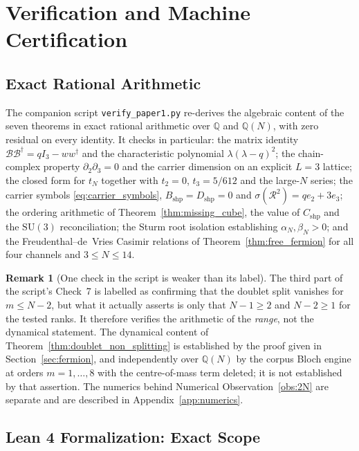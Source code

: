 \documentclass[11pt,a4paper]{article}
\theoremstyle{definition}
\newtheorem{remark}[theorem]{Remark}
\newcommand{\Q}{\mathbb{Q}}
\newcommand{\dg}{^{\dagger}}
\newcommand{\SU}{\mathrm{SU}}
\newcommand{\Bc}{\mathcal{B}}          %
\newcommand{\Rc}{\mathcal{R}}          %
\newcommand{\Bshp}{B_{\mathrm{shp}}}
\newcommand{\Cshp}{C_{\mathrm{shp}}}
\newcommand{\Dshp}{D_{\mathrm{shp}}}
\begin{document}
\section{Verification and Machine Certification}\label{sec:verification}

\subsection{Exact Rational Arithmetic}

The companion script \texttt{verify\_paper1.py} re-derives the algebraic content of the seven theorems in exact rational arithmetic over $\Q$ and $\Q(N)$, with zero residual on every identity. It checks in particular: the matrix identity $\Bc\Bc\dg = qI_3 - ww\dg$ and the characteristic polynomial $\lambda(\lambda-q)^2$; the chain-complex property $\partial_2\partial_3 = 0$ and the carrier dimension on an explicit $L=3$ lattice; the closed form for $t_N$ together with $t_2 = 0$, $t_3 = 5/612$ and the large-$N$ series; the carrier symbols \eqref{eq:carrier_symbols}, $\Bshp = \Dshp = 0$ and $\sigma(\Rc^2) = qe_2 + 3e_3$; the ordering arithmetic of Theorem~\ref{thm:missing_cube}, the value of $\Cshp$ and the $\SU(3)$ reconciliation; the Sturm root isolation establishing $\alpha_N,\beta_N>0$; and the Freudenthal--de~Vries Casimir relations of Theorem~\ref{thm:free_fermion} for all four channels and $3\le N\le 14$.

\begin{remark}[One check in the script is weaker than its label]\label{rem:check7_scope}
The third part of the script's Check~7 is labelled as confirming that the doublet split vanishes for $m\le N-2$, but what it actually asserts is only that $N-1\ge2$ and $N-2\ge1$ for the tested ranks. It therefore verifies the arithmetic of the \emph{range}, not the dynamical statement. The dynamical content of Theorem~\ref{thm:doublet_non_splitting} is established by the proof given in Section~\ref{sec:fermion}, and independently over $\Q(N)$ by the corpus Bloch engine at orders $m = 1,\dots,8$ with the centre-of-mass term deleted; it is not established by that assertion. The numerics behind Numerical Observation~\ref{obs:2N} are separate and are described in Appendix~\ref{app:numerics}.
\end{remark}

\subsection{Lean 4 Formalization: Exact Scope}
\end{document}
